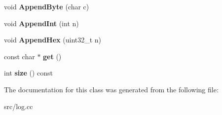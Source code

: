 \begin{DoxyCompactItemize}
\item 
\hypertarget{classv8_1_1internal_1_1_code_event_logger_1_1_name_buffer_a15e386f0af065f8e24d9618984d5c81c}{}void {\bfseries Append\+Byte} (char c)\label{classv8_1_1internal_1_1_code_event_logger_1_1_name_buffer_a15e386f0af065f8e24d9618984d5c81c}

\item 
\hypertarget{classv8_1_1internal_1_1_code_event_logger_1_1_name_buffer_a27cebc7c49e02021340b948768737f71}{}void {\bfseries Append\+Int} (int n)\label{classv8_1_1internal_1_1_code_event_logger_1_1_name_buffer_a27cebc7c49e02021340b948768737f71}

\item 
\hypertarget{classv8_1_1internal_1_1_code_event_logger_1_1_name_buffer_a968c4b740fcf4dc461a27e40e5abe6cf}{}void {\bfseries Append\+Hex} (uint32\+\_\+t n)\label{classv8_1_1internal_1_1_code_event_logger_1_1_name_buffer_a968c4b740fcf4dc461a27e40e5abe6cf}

\item 
\hypertarget{classv8_1_1internal_1_1_code_event_logger_1_1_name_buffer_adb373c1d68105915a34309ed08a0b451}{}const char $\ast$ {\bfseries get} ()\label{classv8_1_1internal_1_1_code_event_logger_1_1_name_buffer_adb373c1d68105915a34309ed08a0b451}

\item 
\hypertarget{classv8_1_1internal_1_1_code_event_logger_1_1_name_buffer_a98373c0e64aa22df947c230186d8adeb}{}int {\bfseries size} () const \label{classv8_1_1internal_1_1_code_event_logger_1_1_name_buffer_a98373c0e64aa22df947c230186d8adeb}

\end{DoxyCompactItemize}


The documentation for this class was generated from the following file\+:\begin{DoxyCompactItemize}
\item 
src/log.\+cc\end{DoxyCompactItemize}
